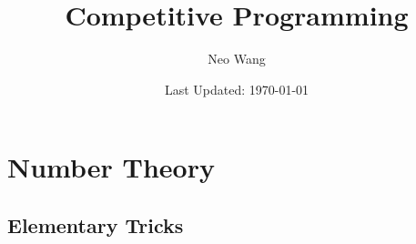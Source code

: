 \documentclass{scrreprt}
\title{Competitive Programming}
\author{Neo Wang}
\date{Last Updated: \today}
\begin{document}
\maketitle
\setcounter{tocdepth}{2}
\tableofcontents
\newpage

\chapter{Number Theory}
\section{Elementary Tricks}

\end{document}
